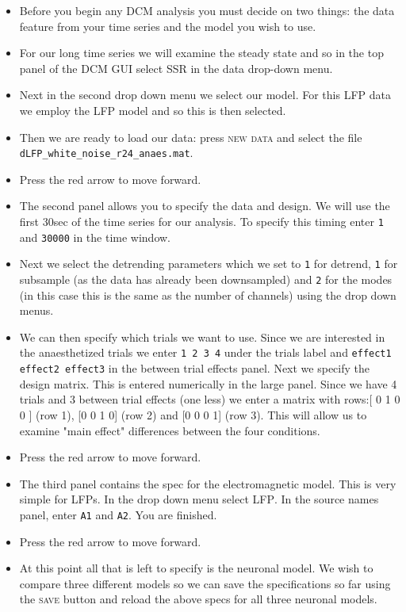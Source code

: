 \begin{itemize}
\item Before you begin any DCM analysis you must decide on two things: the data feature from your time series and the model you wish to use.
\item For our long time series we will examine the steady state and so in the top panel of the DCM GUI select \textsc{SSR} in the data drop-down menu.
\item Next in the second drop down menu we select our model. For this LFP data we employ the \textsc{LFP} model and so this is then selected. 
\item Then we are ready to load our data: press \textsc{new data} and select the file \texttt{dLFP\_white\_noise\_r24\_anaes.mat}.
\item Press the red arrow to move forward.
\item The second panel allows you to specify the data and design. We will use the first 30sec of the time series for our analysis. To specify this timing enter \texttt{1} and \texttt{30000} in the time window.
\item Next we select the detrending parameters which we set to \texttt{1} for detrend, \texttt{1} for subsample (as the data has already been downsampled) and \texttt{2} for the modes (in this case this is the same as the number of channels) using the drop down menus.
\item We can then specify which trials we want to use. Since we are interested in the anaesthetized trials we enter \texttt{1 2 3 4} under the trials label and \texttt{effect1 effect2 effect3} in the between trial effects panel. Next we specify the design matrix. This is entered numerically in the large panel. Since we have 4 trials and 3 between trial effects (one less) we enter a matrix with rows:[ 0 1 0 0 ] (row 1), [0 0 1 0] (row 2) and [0 0 0 1] (row 3). This will allow us to examine "main effect" differences between the four conditions.
\item Press the red arrow to move forward.
\item The third panel contains the spec for the electromagnetic model. This is very simple for LFPs. In the drop down menu select \textsc{LFP}. In the source names panel, enter \texttt{A1} and \texttt{A2}. You are finished.
\item Press the red arrow to move forward.
\item At this point all that is left to specify is the neuronal model. We wish to compare three different models so we can save the specifications so far using the \textsc{save} button and reload the above specs for all three neuronal models.

\end{itemize}
